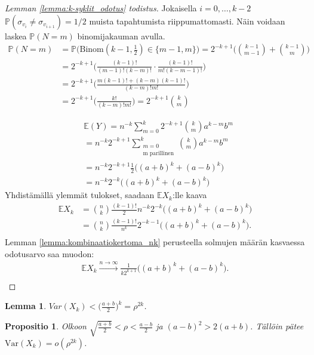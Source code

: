 \documentclass[finnish,12pt,a4paper,pdftex,sci,utf8]{aaltothesis}
\newtheorem{lemma}{Lemma}
\newtheorem{propositio}{Propositio}
\begin{document}
\begin{proof}[Lemman \ref{lemma:k-syklit_odotus} todistus]
	Jokaisella $i = 0, \ldots , k-2$ $\mathbb{P}(\sigma_{v_i} \neq \sigma_{v_{i+1}}) = 1/2$ muista tapahtumista riippumattomasti. Näin voidaan laskea $\mathbb{P}(N = m)$ binomijakauman avulla. 
	\begin{align*}
		\mathbb{P}(N = m) &= \mathbb{P}\big(\text{Binom}(k-1, \frac{1}{2}) \in \{m-1, m\}\big)
		= 2^{-k+1}\Bigg(\binom{k-1}{m-1} + \binom{k-1}{m}\Bigg) \\
		&= 2^{-k+1}\Bigg(\frac{(k-1)!}{(m-1)!(k-m)!} \cdot \frac{(k-1)!}{m!(k-m-1)!}\Bigg) \\
		&= 2^{-k+1}\Bigg(\frac{m(k-1)! + (k-m)(k-1)!}{(k-m)!m!}\Bigg) \\
		&= 2^{-k+1}\Bigg(\frac{k!}{(k-m)!m!}\Bigg) = 2^{-k+1}\binom{k}{m}
	\end{align*}

	\begin{align*}
		&\mathbb{E}(Y) = n^{-k} \sum^{k}_{m=0} 2^{-k+1}\binom{k}{m} a^{k-m}b^{m} \\
		&= n^{-k} 2^{-k+1} \sum_{\substack{m=0 \\ \text{m parillinen}}}^k \binom{k}{m}a^{k-m}b^{m} \\
		&= n^{-k} 2^{-k+1} \frac{1}{2} \big((a+b)^k + (a-b)^k \big) \\
		&= n^{-k} 2^{-k} \big((a+b)^k + (a-b)^k \big)
	\end{align*}
	Yhdistämällä ylemmät tulokset, saadaan $\mathbb{E}X_k$:lle kaava
	\begin{align*}
		\mathbb{E}X_k &= \binom{n}{k}\frac{(k-1)!}{2}  n^{-k} 2^{-k} \big((a+b)^k + (a-b)^k \big) \\
		&= \binom{n}{k}\frac{(k-1)!}{n^{k}} 2^{-k-1} \big((a+b)^k + (a-b)^k \big). \\
	\end{align*}
 	Lemman \ref{lemma:kombinaatiokertoma_nk} perusteella solmujen määrän kasvaessa odotusarvo saa muodon:
	\begin{align*}
		\mathbb{E}X_k \xrightarrow{n \rightarrow \infty} \frac{1}{k2^{k+1}} \big((a+b)^k + (a-b)^k \big). \\
	\end{align*}
\end{proof}


\begin{lemma}
	\label{lemma:var_yläraja}
	$Var(X_k) < \big(\frac{a+b}{2} \big)^k = \rho^{2k}$. \cite{reconstruction}
\end{lemma}

\begin{propositio}
	Olkoon $\sqrt{\frac{a+b}{2}} < \rho < \frac{a-b}{2}$ ja $(a-b)^2 > 2(a+b)$. Tällöin pätee $\text{Var}(X_k) = o(\rho^{2k})$.
\end{propositio}
\end{document}
